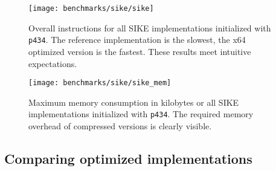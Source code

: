 \begin{figure}[H]
  \centering
  \texttt{[image: benchmarks/sike/sike]}
  \caption[Overall instructions SIKE]
  {Overall instructions for all SIKE implementations initialized with \texttt{p434}. The reference implementation is the slowest, the x64 optimized version is the fastest. These results meet intuitive expectations.}
  \label{fig:results_sike}
\end{figure}

\begin{figure}[H]
  \centering
  \texttt{[image: benchmarks/sike/sike\_mem]}
  \caption[Maximum memory consumption SIKE]
  {Maximum memory consumption in kilobytes or all SIKE implementations initialized with \texttt{p434}. The required memory overhead of compressed versions is clearly visible.}
  \label{fig:results_sike_mem}
\end{figure}

\subsection{Comparing optimized implementations}\label{sec:analysis_optimized}

